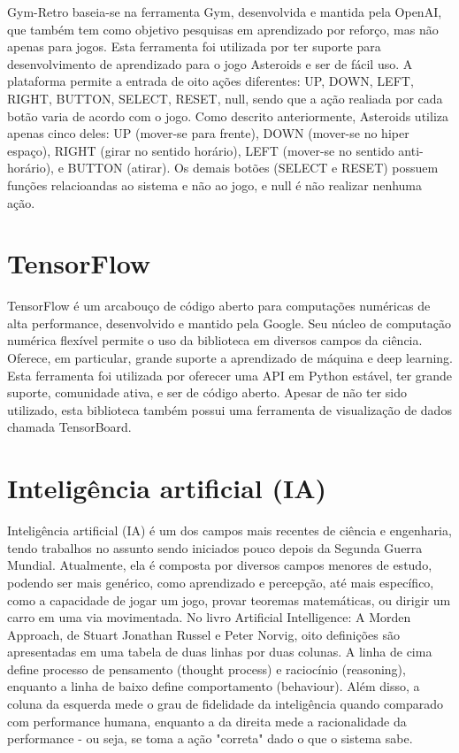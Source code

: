 Gym-Retro baseia-se na ferramenta Gym, desenvolvida e mantida pela OpenAI, que também tem como objetivo pesquisas em aprendizado por reforço, mas não apenas para jogos.
Esta ferramenta foi utilizada por ter suporte para desenvolvimento de aprendizado para o jogo Asteroids e ser de fácil uso. A plataforma permite a entrada de oito ações diferentes: UP, DOWN, LEFT, RIGHT, BUTTON, SELECT, RESET, null, sendo que a ação realiada por cada botão varia de acordo com o jogo. Como descrito anteriormente, Asteroids utiliza apenas cinco deles: UP (mover-se para frente), DOWN (mover-se no hiper espaço), RIGHT (girar no sentido horário), LEFT (mover-se no sentido anti-horário), e BUTTON (atirar). Os demais botões (SELECT e RESET) possuem funções relacioandas ao sistema e não ao jogo, e null é não realizar nenhuma ação.

\section{TensorFlow}
\label{sec:tensorflow}

TensorFlow é um arcabouço de código aberto para computações numéricas de alta performance, desenvolvido e mantido pela Google. Seu núcleo de computação numérica flexível permite o uso da biblioteca em diversos campos da ciência. Oferece, em particular, grande suporte a aprendizado de máquina e deep learning.
Esta ferramenta foi utilizada por oferecer uma API em Python estável, ter grande suporte, comunidade ativa, e ser de código aberto.
Apesar de não ter sido utilizado, esta biblioteca também possui uma ferramenta de visualização de dados chamada TensorBoard.

% 
\section{Inteligência artificial (IA)}
\label{sec:ia}

Inteligência artificial (IA) é um dos campos mais recentes de ciência e engenharia, tendo trabalhos no assunto sendo iniciados pouco depois da Segunda Guerra Mundial. Atualmente, ela é composta por diversos campos menores de estudo, podendo ser mais genérico, como aprendizado e percepção, até mais específico, como a capacidade de jogar um jogo, provar teoremas matemáticas, ou dirigir um carro em uma via movimentada.
No livro Artificial Intelligence: A Morden Approach, de Stuart Jonathan Russel e Peter Norvig, oito definições são apresentadas em uma tabela de duas linhas por duas colunas. A linha de cima define processo de pensamento (thought process) e raciocínio (reasoning), enquanto a linha de baixo define comportamento (behaviour). Além disso, a coluna da esquerda mede o grau de fidelidade da inteligência quando comparado com performance humana, enquanto a da direita mede a racionalidade da performance - ou seja, se toma a ação "correta" dado o que o sistema sabe.

